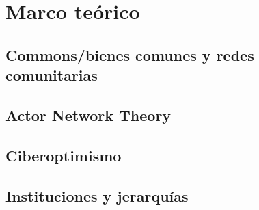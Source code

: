 \section{Marco teórico}

\subsection{Commons/bienes comunes y redes comunitarias}
\subsection{Actor Network Theory}
\subsection{Ciberoptimismo}
\subsection{Instituciones y jerarquías}
